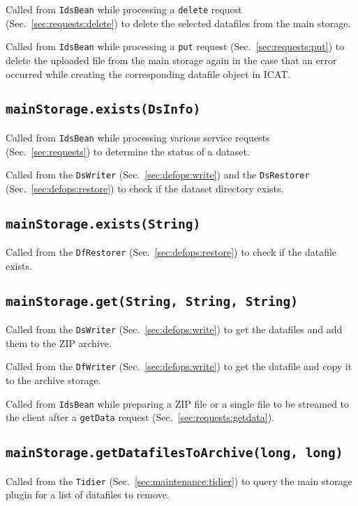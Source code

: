 \documentclass[paper=a4]{scrartcl}
\begin{document}
Called from \texttt{IdsBean} while processing a \texttt{delete}
request (Sec.~\ref{sec:requests:delete}) to delete the selected
datafiles from the main storage.

Called from \texttt{IdsBean} while processing a \texttt{put} request
(Sec.~\ref{sec:requests:put}) to delete the uploaded file from the
main storage again in the case that an error occurred while creating
the corresponding datafile object in ICAT.

\subsection{\texttt{mainStorage.exists(DsInfo)}}

Called from \texttt{IdsBean} while processing various service requests
(Sec.~\ref{sec:requests}) to determine the status of a dataset.

Called from the \texttt{DsWriter} (Sec.~\ref{sec:defops:write}) and
the \texttt{DsRestorer} (Sec.~\ref{sec:defops:restore}) to check if
the dataset directory exists.

\subsection{\texttt{mainStorage.exists(String)}}

Called from the \texttt{DfRestorer} (Sec.~\ref{sec:defops:restore})
to check if the datafile exists.

\subsection{\texttt{mainStorage.get(String, String, String)}}

Called from the \texttt{DsWriter} (Sec.~\ref{sec:defops:write}) to
get the datafiles and add them to the ZIP archive.

Called from the \texttt{DfWriter} (Sec.~\ref{sec:defops:write}) to
get the datafile and copy it to the archive storage.

Called from \texttt{IdsBean} while preparing a ZIP file or a single
file to be streamed to the client after a \texttt{getData} request
(Sec.~\ref{sec:requests:getdata}).

\subsection{\texttt{mainStorage.getDatafilesToArchive(long, long)}}

Called from the \texttt{Tidier} (Sec.~\ref{sec:maintenance:tidier}) to
query the main storage plugin for a list of datafiles to remove.
\end{document}
